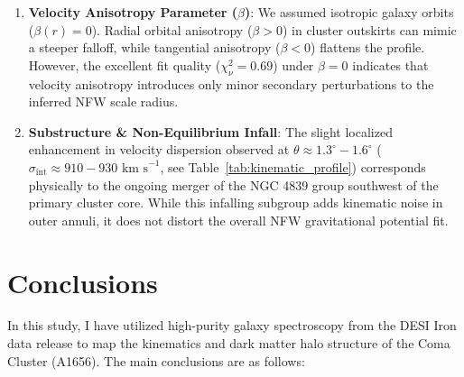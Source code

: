 \documentclass[twocolumn]{aastex631}
\begin{document}
\begin{enumerate}
	\item \textbf{Velocity Anisotropy Parameter ($\beta$)}: We assumed isotropic galaxy orbits ($\beta(r) = 0$). Radial orbital anisotropy ($\beta > 0$) in cluster outskirts can mimic a steeper falloff, while tangential anisotropy ($\beta < 0$) flattens the profile. However, the excellent fit quality ($\chi_\nu^2 = 0.69$) under $\beta=0$ indicates that velocity anisotropy introduces only minor secondary perturbations to the inferred NFW scale radius.

	\item \textbf{Substructure \& Non-Equilibrium Infall}: The slight localized enhancement in velocity dispersion observed at $\theta \approx 1.3^\circ - 1.6^\circ$ ($\sigma_{\text{int}} \approx 910 - 930 \text{ km s}^{-1}$, see Table~\ref{tab:kinematic_profile}) corresponds physically to the ongoing merger of the NGC 4839 group southwest of the primary cluster core. While this infalling subgroup adds kinematic noise in outer annuli, it does not distort the overall NFW gravitational potential fit.
\end{enumerate}

\section{Conclusions}
\label{sec:conclusions}

In this study, I have utilized high-purity galaxy spectroscopy from the DESI Iron data release to map the kinematics and dark matter halo structure of the Coma Cluster (A1656). The main conclusions are as follows:
\end{document}
